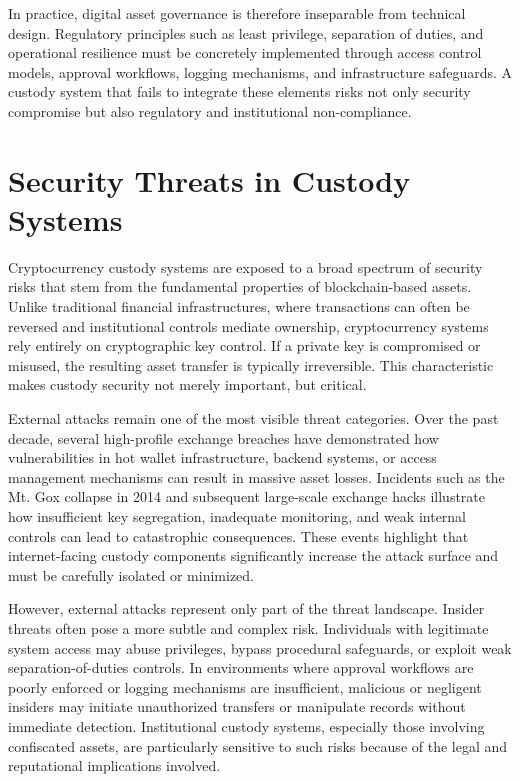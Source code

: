 \documentclass[12pt,a4paper]{report}
\begin{document}
In practice, digital asset governance is therefore inseparable from technical design. Regulatory principles such as least privilege, separation of duties, and operational resilience must be concretely implemented through access control models, approval workflows, logging mechanisms, and infrastructure safeguards. A custody system that fails to integrate these elements risks not only security compromise but also regulatory and institutional non-compliance.

\section{Security Threats in Custody Systems}

Cryptocurrency custody systems are exposed to a broad spectrum of security risks that stem from the fundamental properties of blockchain-based assets. Unlike traditional financial infrastructures, where transactions can often be reversed and institutional controls mediate ownership, cryptocurrency systems rely entirely on cryptographic key control. If a private key is compromised or misused, the resulting asset transfer is typically irreversible. This characteristic makes custody security not merely important, but critical.

External attacks remain one of the most visible threat categories. Over the past decade, several high-profile exchange breaches have demonstrated how vulnerabilities in hot wallet infrastructure, backend systems, or access management mechanisms can result in massive asset losses. Incidents such as the Mt. Gox collapse in 2014 and subsequent large-scale exchange hacks illustrate how insufficient key segregation, inadequate monitoring, and weak internal controls can lead to catastrophic consequences. These events highlight that internet-facing custody components significantly increase the attack surface and must be carefully isolated or minimized.

However, external attacks represent only part of the threat landscape. Insider threats often pose a more subtle and complex risk. Individuals with legitimate system access may abuse privileges, bypass procedural safeguards, or exploit weak separation-of-duties controls. In environments where approval workflows are poorly enforced or logging mechanisms are insufficient, malicious or negligent insiders may initiate unauthorized transfers or manipulate records without immediate detection. Institutional custody systems, especially those involving confiscated assets, are particularly sensitive to such risks because of the legal and reputational implications involved.
\end{document}
